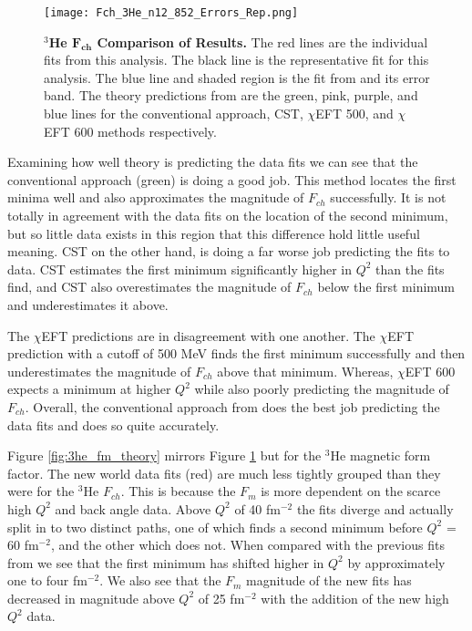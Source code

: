 \begin{figure}[!ht]
	\begin{center}
	\texttt{[image: Fch\_3He\_n12\_852\_Errors\_Rep.png]}
	\end{center}
	\caption[$^3$He $F_{ch}$ Comparison of Results]{
	{\bf{$^3$He $\boldsymbol{F_{ch}}$ Comparison of Results.}} The red lines are the individual fits from this analysis. The black line is the representative fit for this analysis. The blue line and shaded region is the fit from \cite{Article:Amroun} and its error band. The theory predictions from \cite{Article:Marcucci} are the green, pink, purple, and blue lines for the conventional approach, CST, $\chi$EFT 500, and $\chi$EFT 600 methods respectively.}
	\label{fig:3he_fch_theory}
\end{figure}
	
Examining how well theory is predicting the data fits we can see that the conventional approach (green) is doing a good job. This method locates the first minima well and also approximates the magnitude of $F_{ch}$ successfully. It is not totally in agreement with the data fits on the location of the second minimum, but so little data exists in this region that this difference hold little useful meaning. CST on the other hand, is doing a far worse job predicting the fits to data. CST estimates the first minimum significantly higher in $Q^2$ than the fits find, and CST also overestimates the magnitude of $F_{ch}$ below the first minimum and underestimates it above. 

The $\chi$EFT predictions are in disagreement with one another. The $\chi$EFT prediction with a cutoff of 500 MeV finds the first minimum successfully and then underestimates the magnitude of $F_{ch}$ above that minimum. Whereas, $\chi$EFT 600 expects a minimum at higher $Q^2$ while also poorly predicting the magnitude of $F_{ch}$. Overall, the conventional approach from \cite{Article:Marcucci} does the best job predicting the data fits and does so quite accurately. 

Figure \ref{fig:3he_fm_theory} mirrors Figure \ref{fig:3he_fch_theory} but for the $^3$He magnetic form factor. The new world data fits (red) are much less tightly grouped than they were for the $^3$He $F_{ch}$. This is because the $F_m$ is more dependent on the scarce high $Q^2$ and back angle data. Above $Q^2$ of 40 fm$^{-2}$ the fits diverge and actually split in to two distinct paths, one of which finds a second minimum before $Q^2$ = 60 fm$^{-2}$, and the other which does not. When compared with the previous fits from \cite{Article:Amroun} we see that the first minimum has shifted higher in $Q^2$ by approximately one to four fm$^{-2}$. We also see that the $F_m$ magnitude of the new fits has decreased in magnitude above $Q^2$ of 25 fm$^{-2}$ with the addition of the new high $Q^2$ data.

